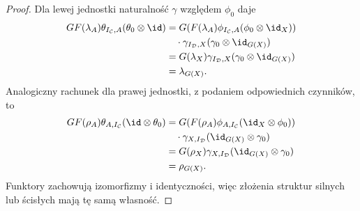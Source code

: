 \begin{proof}
Dla lewej jednostki naturalność $\gamma$ względem $\phi_0$ daje
\[
\begin{aligned}
GF(\lambda_A)\theta_{I_{\mathcal C},A}(\theta_0\otimes\id)
&=G(F(\lambda_A)\phi_{I_{\mathcal C},A}(\phi_0\otimes\id_X))\\
&\quad{}\cdot\gamma_{I_{\mathcal D},X}(\gamma_0\otimes\id_{G(X)})\\
&=G(\lambda_X)\gamma_{I_{\mathcal D},X}(\gamma_0\otimes\id_{G(X)})\\
&=\lambda_{G(X)}.
\end{aligned}
\]
Analogiczny rachunek dla prawej jednostki, z podaniem odpowiednich czynników, to
\[
\begin{aligned}
GF(\rho_A)\theta_{A,I_{\mathcal C}}(\id\otimes\theta_0)
&=G(F(\rho_A)\phi_{A,I_{\mathcal C}}(\id_X\otimes\phi_0))\\
&\quad{}\cdot\gamma_{X,I_{\mathcal D}}(\id_{G(X)}\otimes\gamma_0)\\
&=G(\rho_X)\gamma_{X,I_{\mathcal D}}(\id_{G(X)}\otimes\gamma_0)\\
&=\rho_{G(X)}.
\end{aligned}
\]
Funktory zachowują izomorfizmy i identyczności, więc złożenia struktur silnych lub ścisłych mają tę samą własność.
\end{proof}

